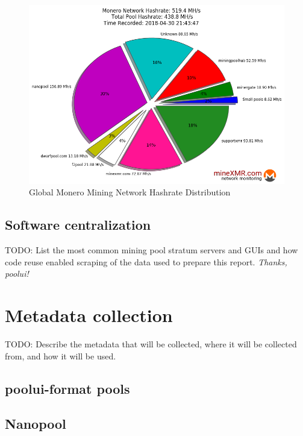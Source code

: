 \documentclass[notitlepage]{report}
\begin{document}
\begin{figure}[h]
\centering
\includegraphics[width=\textwidth]{global-monero-mining-network-hashrate-distribution-2018-04-30}
\captionsetup{labelformat=empty}
\caption{Global Monero Mining Network Hashrate Distribution}
\label{fig:hashrate-distribution}
\end{figure}

\subsection{Software centralization}

TODO: List the most common mining pool stratum servers and GUIs and how code reuse enabled scraping of the data used to prepare this report.  \textit{Thanks, poolui!}


\section{Metadata collection}

TODO: Describe the metadata that will be collected, where it will be collected from, and how it will be used.

\subsection{poolui-format pools}

\subsection{Nanopool} \label{Nanopool}
\end{document}
